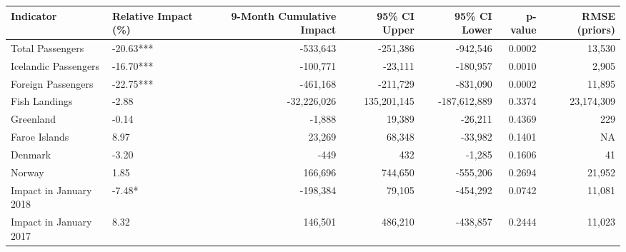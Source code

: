 \begin{tabular}[t]{l|l|r|r|r|r|r}
\hline
Indicator & Relative Impact (\%) & 9-Month Cumulative Impact & 95\% CI Upper & 95\% CI Lower & p-value & RMSE (priors)\\
\hline
Total Passengers & -20.63*** & -533,643 & -251,386 & -942,546 & 0.0002 & 13,530\\
\hline
Icelandic Passengers & -16.70*** & -100,771 & -23,111 & -180,957 & 0.0010 & 2,905\\
\hline
Foreign Passengers & -22.75*** & -461,168 & -211,729 & -831,090 & 0.0002 & 11,895\\
\hline
\hline
Fish Landings & -2.88 & -32,226,026 & 135,201,145 & -187,612,889 & 0.3374 & 23,174,309\\
\hline
Greenland & -0.14 & -1,888 & 19,389 & -26,211 & 0.4369 & 229\\
\hline
Faroe Islands & 8.97 & 23,269 & 68,348 & -33,982 & 0.1401 & NA\\
\hline
Denmark & -3.20 & -449 & 432 & -1,285 & 0.1606 & 41\\
\hline
Norway & 1.85 & 166,696 & 744,650 & -555,206 & 0.2694 & 21,952\\
\hline
Impact in January 2018 & -7.48* & -198,384 & 79,105 & -454,292 & 0.0742 & 11,081\\
\hline
Impact in January 2017 & 8.32 & 146,501 & 486,210 & -438,857 & 0.2444 & 11,023\\
\hline
\end{tabular}
